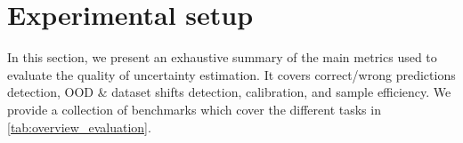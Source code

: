 
\section{Experimental setup}

In this section, we present an exhaustive summary of the main metrics used to evaluate the quality of uncertainty estimation. 
It covers correct/wrong predictions detection, OOD \& dataset shifts detection, calibration, and sample efficiency.
We provide a collection of benchmarks which cover the different tasks in \cref{tab:overview_evaluation}.

